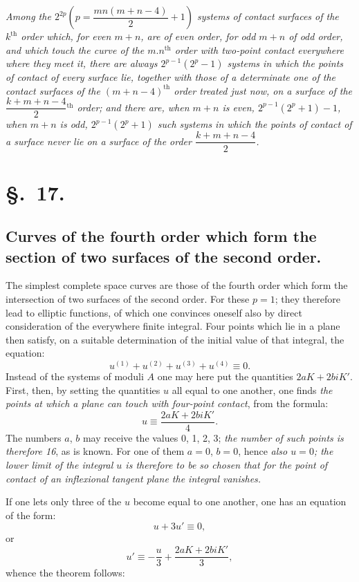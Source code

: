 \documentclass{article}
\begin{document}
\emph{Among the $2^{2p}\left(p = \dfrac{mn(m+n-4)}{2}+1\right)$ systems of contact surfaces of the $k^{\text{th}}$ order which, for even $m+n$, are of even order, for odd $m+n$ of odd order, and which touch the curve of the $m.n^{\text{th}}$ order with two-point contact everywhere where they meet it, there are always $2^{p-1}(2^{p}-1)$ systems in which the points of contact of every surface lie, together with those of a determinate one of the contact surfaces of the $(m+n-4)^{\text{th}}$ order treated just now, on a surface of the $\dfrac{k+m+n-4}{2}{}^{\text{th}}$ order; and there are, when $m+n$ is even, $2^{p-1}(2^{p}+1)-1$, when $m+n$ is odd, $2^{p-1}(2^{p}+1)$ such systems in which the points of contact of a surface never lie on a surface of the order $\dfrac{k+m+n-4}{2}$.}

\section*{§.~17.}
\subsection*{Curves of the fourth order which form the section of two surfaces of the second order.}

The simplest complete space curves are those of the fourth order which form the intersection of two surfaces of the second order. For these $p=1$; they therefore lead to elliptic functions, of which one convinces oneself also by direct consideration of the everywhere finite integral. Four points which lie in a plane then satisfy, on a suitable determination of the initial value of that integral, the equation:
\[
u^{(1)}+u^{(2)}+u^{(3)}+u^{(4)} \equiv 0.
\]
Instead of the systems of moduli $A$ one may here put the quantities $2aK+2biK'$. First, then, by setting the quantities $u$ all equal to one another, one finds \emph{the points at which a plane can touch with four-point contact}, from the formula:
\[
u \equiv \frac{2aK+2biK'}{4}. \tag{25.}
\]
The numbers $a$, $b$ may receive the values 0, 1, 2, 3; \emph{the number of such points is therefore 16}, as is known. For one of them $a=0$, $b=0$, hence \emph{also $u=0$; the lower limit of the integral $u$ is therefore to be so chosen that for the point of contact of an inflexional tangent plane the integral vanishes.}


If one lets only three of the $u$ become equal to one another, one has an equation of the form:
\[
u+3u' \equiv 0,
\]
or
\[
u' \equiv -\frac{u}{3}+\frac{2aK+2biK'}{3}, \tag{26.}
\]
whence the theorem follows:
\end{document}
